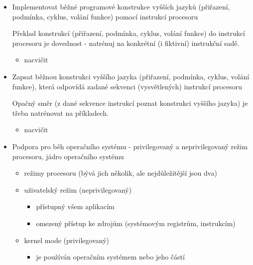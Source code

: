 \begin{itemize}
\begin{itemize}
\begin{itemize}
\item např. 4bajtový int musí mít adresu zarovnanou na 4 (dělitelnou čtyřmi)
\item celá struktura (struct) je zarovnaná na největší datový typ dostupný na CPU (např. 16B)
\item některé jazyky přehazují položky ve struktuře, aby se eliminovalo volné místo
\item sizeof vrátí velikost včetně těch mezer 
\end{itemize}
\end{itemize}
\item Implementovat běžné programové konstrukce vyšších jazyků (přiřazení, podmínka, cyklus, volání funkce) pomocí instrukcí procesoru
\begin{practicebox}
Překlad konstrukcí (přiřazení, podmínka, cyklus, volání funkce) do instrukcí procesoru je dovednost - natrénuj na konkrétní (i fiktivní) instrukční sadě.
\end{practicebox}
\begin{itemize}
\item nacvičit
\end{itemize}
\item Zapsat běžnou konstrukci vyššího jazyka (přiřazení, podmínka, cyklus, volání funkce), která odpovídá zadané sekvenci (vysvětlených) instrukcí procesoru
\begin{practicebox}
Opačný směr (z dané sekvence instrukcí poznat konstrukci vyššího jazyka) je třeba natrénovat na příkladech.
\end{practicebox}
\begin{itemize}
\item nacvičit
\end{itemize}
\item Podpora pro běh operačního systému - privilegovaný a neprivilegovaný režim procesoru, jádro operačního systému
\begin{itemize}
\item režimy procesoru (bývá jich několik, ale nejdůležitější jsou dva)
\item uživatelský režim (neprivilegovaný)
\begin{itemize}
\item přístupný všem aplikacím
\item omezený přístup ke zdrojům (systémovým registrům, instrukcím)
\end{itemize}
\item kernel mode (privilegovaný)
\begin{itemize}
\item je používán operačním systémem nebo jeho částí

\end{itemize}
\end{itemize}
\end{itemize}
